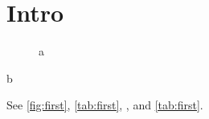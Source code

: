 \documentclass[twocolumn,unicode]{wrapper}
\begin{document}
\wrapperclass\articleclass\layoutmode\hypermode
\section{Intro}
\begin{figure}\label{fig:first}a\end{figure}
\begin{table}\label{tab:first}b\end{table}
See \autoref{fig:first}, \cref{tab:first}, , and \vref{tab:first}.
\end{document}
